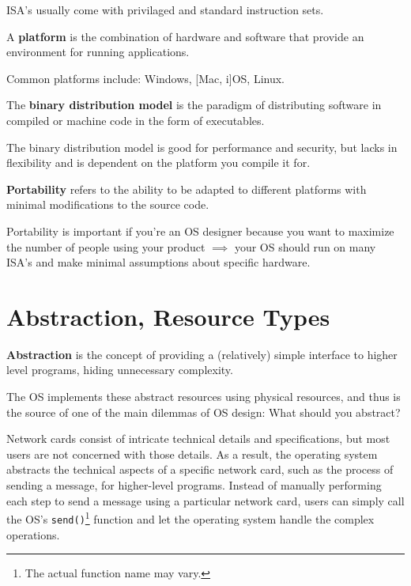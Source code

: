 \documentclass{article}
\begin{document}
ISA's usually come with privilaged and standard instruction sets.

\begin{tcolorbox}[title=Definition: Platform]
  A \textbf{platform} is the combination of hardware and software that provide an environment for
  running applications.
\end{tcolorbox}

Common platforms include: Windows, [Mac, i]OS, Linux.

\begin{tcolorbox}[title=Definition: Binary Distribution Model]
  The \textbf{binary distribution model} is the paradigm of distributing software in compiled or
  machine code in the form of executables.
\end{tcolorbox}

The binary distribution model is good for performance and security, but lacks in flexibility and is
dependent on the platform you compile it for.

\begin{tcolorbox}[title=Definition: Portability]
  \textbf{Portability} refers to the ability to be adapted to different platforms with minimal
  modifications to the source code.
\end{tcolorbox}

Portability is important if you're an OS designer because you want to maximize the number of people
using your product $\implies$ your OS should run on many ISA's and make minimal assumptions about
specific hardware.





\section{Abstraction, Resource Types}
\begin{tcolorbox}[title=Definition: Abstraction]
  \textbf{Abstraction} is the concept of providing a (relatively) simple interface to higher level
  programs, hiding unnecessary complexity.
\end{tcolorbox}

The OS implements these abstract resources using physical resources, and thus is the source of one
of the main dilemmas of OS design: What should you abstract?

\begin{tcolorbox}[colback=blue!5!white,colframe=black!75!blue,title=Example: Network Neverland]
  Network cards consist of intricate technical details and specifications, but most users are not
  concerned with those details. As a result, the operating system abstracts the technical aspects of a
  specific network card, such as the process of sending a message, for higher-level programs. Instead
  of manually performing each step to send a message using a particular network card, users can simply
  call the OS's \texttt{send()}\footnote{The actual function name may vary.} function and let the
  operating system handle the complex operations. 
\end{tcolorbox}
\end{document}
